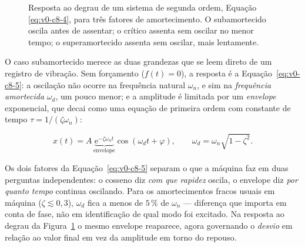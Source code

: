 \documentclass[12pt,a4paper]{article}
\numberwithin{equation}{section}
\numberwithin{table}{section}
\numberwithin{figure}{section}
\begin{document}
\begin{figure}[H]
\centering
{}
\caption[Resposta de sistemas de segunda ordem por regime de amortecimento.]{%
Resposta ao degrau de um sistema de segunda ordem, Equação
\eqref{eq:v0-c8-4}, para três fatores de amortecimento. O subamortecido
oscila antes de assentar; o crítico assenta sem oscilar no menor tempo; o
superamortecido assenta sem oscilar, mais lentamente.}
\label{fig:v0-c8-1}
\end{figure}

O caso subamortecido merece as duas grandezas que se leem direto de um
registro de vibração. Sem forçamento ($f(t) = 0$), a resposta é a
Equação~\eqref{eq:v0-c8-5}: a oscilação não ocorre na frequência natural
$\omega_n$, e sim na \emph{frequência amortecida} $\omega_d$, um pouco
menor; e a amplitude é limitada por um \emph{envelope} exponencial, que
decai como uma equação de primeira ordem com constante de tempo
$\tau = 1/(\zeta\omega_n)$:

\begin{equation}\label{eq:v0-c8-5}
x(t) = A\,\underbrace{\mathrm{e}^{-\zeta\omega_n t}}_{\text{envelope}}
       \cos(\omega_d t + \varphi),
\qquad
\omega_d = \omega_n\sqrt{1 - \zeta^2}.
\end{equation}

Os dois fatores da Equação~\eqref{eq:v0-c8-5} separam o que a máquina faz
em duas perguntas independentes: o cosseno diz \emph{com que rapidez}
oscila, o envelope diz \emph{por quanto tempo} continua oscilando. Para
os amortecimentos fracos usuais em máquina ($\zeta \lesssim 0{,}3$),
$\omega_d$ fica a menos de $5\,\%$ de $\omega_n$ --- diferença que importa
em conta de fase, não em identificação de qual modo foi excitado. Na
resposta ao degrau da Figura~\ref{fig:v0-c8-1} o mesmo envelope
reaparece, agora governando o \emph{desvio} em relação ao valor final em
vez da amplitude em torno do repouso.
\end{document}
